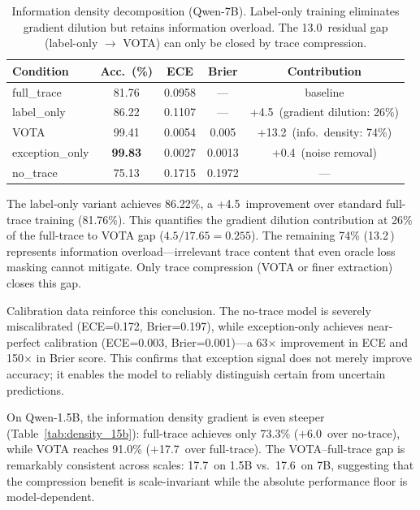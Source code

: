 \documentclass[11pt]{article}
\newcommand{\best}[1]{\textbf{\textcolor{bestcolor}{#1}}}
\newcommand{\pp}{\,\text{pp}}
\begin{document}
\begin{table}[t]
\centering
\small
\caption{Information density decomposition (Qwen-7B). Label-only training eliminates gradient dilution but retains information overload. The 13.0\pp{} residual gap (label-only $\rightarrow$ VOTA) can only be closed by trace compression.}
\label{tab:density}
\begin{tabular}{@{}lcccc@{}}
\toprule
\textbf{Condition} & \textbf{Acc.\ (\%)} & \textbf{ECE} & \textbf{Brier} & \textbf{Contribution} \\
\midrule
full\_trace       & 81.76 & 0.0958 & --- & baseline \\
label\_only       & 86.22 & 0.1107 & --- & +4.5\pp{} (gradient dilution: 26\%) \\
VOTA              & 99.41 & 0.0054 & 0.005 & +13.2\pp{} (info.\ density: 74\%) \\
exception\_only   & \best{99.83} & 0.0027 & 0.0013 & +0.4\pp{} (noise removal) \\
\midrule
no\_trace         & 75.13 & 0.1715 & 0.1972 & --- \\
\bottomrule
\end{tabular}
\end{table}

The label-only variant achieves 86.22\%, a +4.5\pp{} improvement over standard full-trace training (81.76\%).
This quantifies the gradient dilution contribution at 26\% of the full-trace to VOTA gap ($4.5 / 17.65 = 0.255$).
The remaining 74\% (13.2\pp) represents information overload---irrelevant trace content that even oracle loss masking cannot mitigate.
Only trace compression (VOTA or finer extraction) closes this gap.

Calibration data reinforce this conclusion.
The no-trace model is severely miscalibrated (ECE=0.172, Brier=0.197), while exception-only achieves near-perfect calibration (ECE=0.003, Brier=0.001)---a 63$\times$ improvement in ECE and 150$\times$ in Brier score.
This confirms that exception signal does not merely improve accuracy; it enables the model to reliably distinguish certain from uncertain predictions.

On Qwen-1.5B, the information density gradient is even steeper (Table~\ref{tab:density_15b}): full-trace achieves only 73.3\% ($+$6.0\pp{} over no-trace), while VOTA reaches 91.0\% ($+$17.7\pp{} over full-trace).
The VOTA--full-trace gap is remarkably consistent across scales: 17.7\pp{} on 1.5B vs.\ 17.6\pp{} on 7B, suggesting that the compression benefit is scale-invariant while the absolute performance floor is model-dependent.
\end{document}
